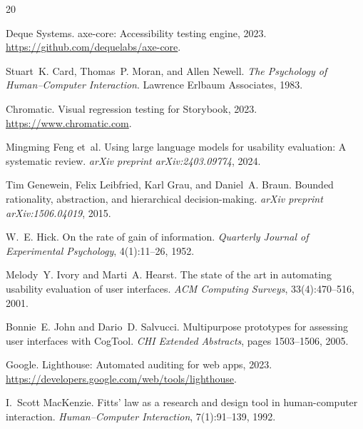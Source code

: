 \documentclass[11pt,twocolumn]{article}
\theoremstyle{definition}
\begin{document}

\begin{thebibliography}{20}

Deque Systems.
\newblock axe-core: Accessibility testing engine, 2023.
\newblock \url{https://github.com/dequelabs/axe-core}.

Stuart~K. Card, Thomas~P. Moran, and Allen Newell.
\newblock \emph{The Psychology of Human--Computer Interaction}.
\newblock Lawrence Erlbaum Associates, 1983.

Chromatic.
\newblock Visual regression testing for Storybook, 2023.
\newblock \url{https://www.chromatic.com}.

Mingming Feng et~al.
\newblock Using large language models for usability evaluation: A systematic review.
\newblock \emph{arXiv preprint arXiv:2403.09774}, 2024.

Tim Genewein, Felix Leibfried, Karl Grau, and Daniel~A. Braun.
\newblock Bounded rationality, abstraction, and hierarchical decision-making.
\newblock \emph{arXiv preprint arXiv:1506.04019}, 2015.

W.~E. Hick.
\newblock On the rate of gain of information.
\newblock \emph{Quarterly Journal of Experimental Psychology}, 4(1):11--26, 1952.

Melody~Y. Ivory and Marti~A. Hearst.
\newblock The state of the art in automating usability evaluation of user interfaces.
\newblock \emph{ACM Computing Surveys}, 33(4):470--516, 2001.

Bonnie~E. John and Dario~D. Salvucci.
\newblock Multipurpose prototypes for assessing user interfaces with CogTool.
\newblock \emph{CHI Extended Abstracts}, pages 1503--1506, 2005.

Google.
\newblock Lighthouse: Automated auditing for web apps, 2023.
\newblock \url{https://developers.google.com/web/tools/lighthouse}.

I.~Scott MacKenzie.
\newblock Fitts' law as a research and design tool in human-computer interaction.
\newblock \emph{Human--Computer Interaction}, 7(1):91--139, 1992.


\end{thebibliography}
\end{document}
